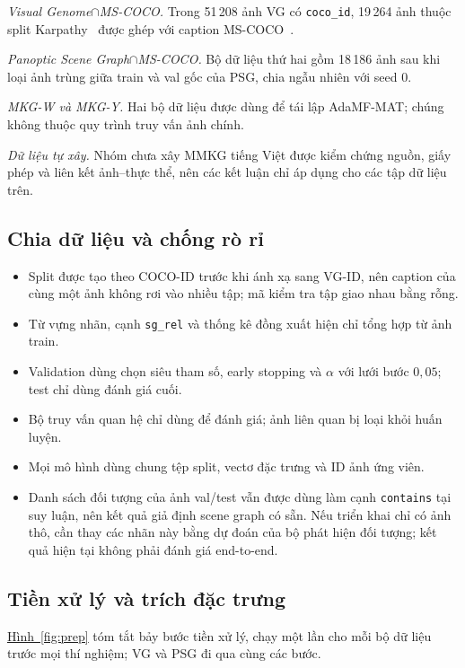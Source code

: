 \documentclass[conference]{IEEEtran}
\begin{document}
\textit{Visual Genome$\cap$MS-COCO.} Trong 51\,208 ảnh VG có \texttt{coco\_id}, 19\,264 ảnh thuộc split Karpathy~\cite{karpathy} được ghép với caption MS-COCO~\cite{coco}.

\textit{Panoptic Scene Graph$\cap$MS-COCO.} Bộ dữ liệu thứ hai gồm 18\,186 ảnh sau khi loại ảnh trùng giữa train và val gốc của PSG, chia ngẫu nhiên với seed 0.

\textit{MKG-W và MKG-Y.} Hai bộ dữ liệu được dùng để tái lập AdaMF-MAT; chúng không thuộc quy trình truy vấn ảnh chính.

\textit{Dữ liệu tự xây.} Nhóm chưa xây MMKG tiếng Việt được kiểm chứng nguồn, giấy phép và liên kết ảnh--thực thể, nên các kết luận chỉ áp dụng cho các tập dữ liệu trên.

\subsection{Chia dữ liệu và chống rò rỉ}\label{sec:split}
\begin{itemize}
\item Split được tạo theo COCO-ID trước khi ánh xạ sang VG-ID, nên caption của cùng một ảnh không rơi vào nhiều tập; mã kiểm tra tập giao nhau bằng rỗng.
\item Từ vựng nhãn, cạnh \texttt{sg\_rel} và thống kê đồng xuất hiện chỉ tổng hợp từ ảnh train.
\item Validation dùng chọn siêu tham số, early stopping và $\alpha$ với lưới bước $0{,}05$; test chỉ dùng đánh giá cuối.
\item Bộ truy vấn quan hệ chỉ dùng để đánh giá; ảnh liên quan bị loại khỏi huấn luyện.
\item Mọi mô hình dùng chung tệp split, vectơ đặc trưng và ID ảnh ứng viên.
\item Danh sách đối tượng của ảnh val/test vẫn được dùng làm cạnh \texttt{contains} tại suy luận, nên kết quả giả định scene graph có sẵn. Nếu triển khai chỉ có ảnh thô, cần thay các nhãn này bằng dự đoán của bộ phát hiện đối tượng; kết quả hiện tại không phải đánh giá end-to-end.
\end{itemize}

\subsection{Tiền xử lý và trích đặc trưng}
\hyperref[fig:prep]{Hình~\ref*{fig:prep}} tóm tắt bảy bước tiền xử lý, chạy một lần cho mỗi bộ dữ liệu trước mọi thí nghiệm; VG và PSG đi qua cùng các bước.
\end{document}
